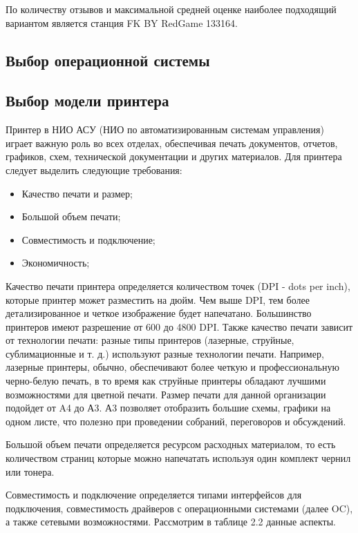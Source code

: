 По количеству отзывов и максимальной средней оценке наиболее подходящий вариантом является станция FK BY RedGame 133164.

\subsection{Выбор операционной системы}

\subsection{Выбор модели принтера}

Принтер в НИО АСУ (НИО по автоматизированным системам управления) играет важную роль во всех отделах, 
обеспечивая печать документов, отчетов, графиков, схем, технической документации и других материалов.
Для принтера следует выделить следующие требования:

\begin{itemize}
    \item Качество печати и размер;
    \item Большой объем печати;
    \item Совместимость и подключение;
    \item Экономичность;
\end{itemize}

Качество печати принтера определяется количеством точек (DPI - dots per inch), которые принтер может разместить на дюйм. 
Чем выше DPI, тем более детализированное и четкое изображение будет напечатано. 
Большинство принтеров имеют разрешение от 600 до 4800 DPI. Также качество печати зависит от технологии печати: разные типы принтеров 
(лазерные, струйные, сублимационные и т. д.) используют разные технологии печати. Например, лазерные принтеры, обычно, обеспечивают 
более четкую и профессиональную черно-белую печать, в то время как струйные принтеры обладают лучшими возможностями для цветной печати.
Размер печати для данной организации подойдет от A4 до А3. А3 позволяет отобразить большие схемы, графики на одном листе, что полезно 
при проведении собраний, переговоров и обсуждений.

Большой объем печати определяется ресурсом расходных материалом, то есть количеством страниц которые можно напечатать используя один комплект 
чернил или тонера.

Совместимость и подключение определяется типами интерфейсов для подключения, совместимость драйверов с операционными 
системами (далее OC), а также сетевыми возможностями.
Рассмотрим в таблице 2.2 данные аспекты.

